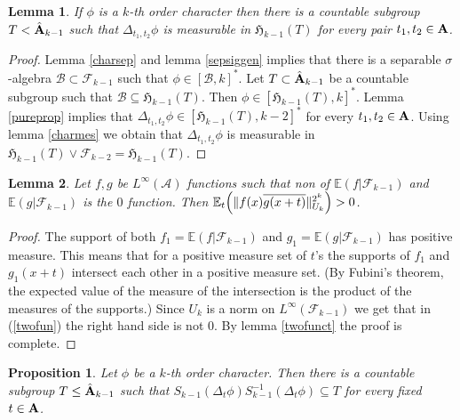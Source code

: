 \documentclass [11pt] {article}
\newtheorem{lemma}{Lemma}[section]
\newtheorem{proposition}{Proposition}[section]
\def\bA{{\bf A}}
\begin{document}
\begin{lemma}\label{secder} If $\phi$ is a $k$-th order character then there is a countable subgroup $T<\hat{\bA}_{k-1}$ such that $\Delta_{t_1,t_2}\phi$ is measurable in $\mathfrak{H}_{k-1}(T)$ for every pair $t_1,t_2\in\bA$. 
\end{lemma}

\begin{proof} Lemma \ref{charsep} and lemma \ref{sepsiggen} implies that there is a separable $\sigma$-algebra $\mathcal{B}\subset\mathcal{F}_{k-1}$ such that $\phi\in [\mathcal{B},k]^*$. Let $T\subset\hat{\bA}_{k-1}$ be a countable subgroup such that $\mathcal{B}\subseteq\mathfrak{H}_{k-1}(T)$. 
Then $\phi\in[\mathfrak{H}_{k-1}(T),k]^*$. Lemma \ref{pureprop} implies that $\Delta_{t_1,t_2}\phi\in[\mathfrak{H}_{k-1}(T),k-2]^*$ for every $t_1,t_2\in\bA$.
Using lemma \ref{charmes} we obtain that $\Delta_{t_1,t_2}\phi$ is measurable in $\mathfrak{H}_{k-1}(T)\vee\mathcal{F}_{k-2}=\mathfrak{H}_{k-1}(T)$.
\end{proof}

\begin{lemma}\label{nozer} Let $f,g$ be $L^\infty(\mathcal{A})$ functions such that non of $\mathbb{E}(f|\mathcal{F}_{k-1})$ and $\mathbb{E}(g|\mathcal{F}_{k-1})$ is the $0$ function.  Then  $\mathbb{E}_t\Bigl(\|f(x)\overline{g(x+t)}\|_{U_k}^{2^k}\Bigr)>0$.
\end{lemma}

\begin{proof} The support of both $f_1=\mathbb{E}(f|\mathcal{F}_{k-1})$ and $g_1=\mathbb{E}(g|\mathcal{F}_{k-1})$ has positive measure. This means that for a positive measure set of $t$'s the supports of $f_1$ and $g_1(x+t)$ intersect each other in a positive measure set. (By Fubini's theorem, the expected value of the measure of the intersection is the product of the measures of the supports.) Since $U_k$ is a norm on $L^\infty(\mathcal{F}_{k-1})$ we get that in (\ref{twofun}) the right hand side is not $0$. By lemma \ref{twofunct} the proof is complete.
\end{proof}

\begin{proposition}\label{fixtype} Let $\phi$ be a $k$-th order character. Then there is a countable subgroup $T\leq\hat{\bA}_{k-1}$ such that $S_{k-1}(\Delta_t\phi)S_{k-1}^{-1}(\Delta_t\phi)\subseteq T$ for every fixed $t\in \bA$.
\end{proposition}
\end{document}

